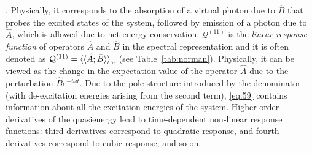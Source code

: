 \documentclass[%
class = book,%
crop = false,%
float = true,%
multi = true,%
preview = false,%
]{standalone}
\begin{document}
. Physically, it corresponds to the absorption of a virtual photon due to \(\hat{B}\) that probes the excited states of the system, followed by emission of a photon due to \(\hat{A}\), which is allowed due to net energy conservation. \(\mathcal{Q}^{(11)}\) is the \emph{linear response function} of operators \(\hat{A}\) and \(\hat{B}\) in the spectral representation and it is often denoted as \(\mathcal{Q}^{(11)} = \braket{\braket{\hat{A};\hat{B}}}_{\omega}\) (see Table~\ref{tab:norman}). Physically, it can be viewed as the change in the expectation value of the operator \(\hat{A}\) due to the perturbation \(\hat{B}e^{-i\omega t}\). Due to the pole structure introduced by the denominator (with de-excitation energies arising from the second term), \eqref{eq:59} contains information about all the excitation energies of the system. Higher-order derivatives of the quasienergy lead to time-dependent non-linear response functions: third derivatives correspond to quadratic response, and fourth derivatives correspond to cubic response, and so on.



\end{document}
